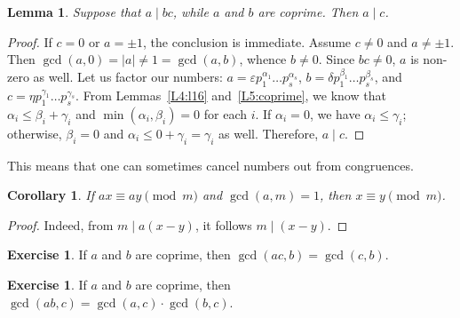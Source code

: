 \documentclass[12pt,notitlepage]{article}
\theoremstyle{plain}
\newtheorem{lemma}[thm]{Lemma}
\newtheorem{corr}[thm]{Corollary}
\theoremstyle{definition}
\newtheorem{exc}[thm]{Exercise}
\theoremstyle{plain}
\newcommand{\eps}{\varepsilon}
\newcommand{\1}{\mathbf{1}}
\newcommand{\0}{\mathbf{0}}
\newcommand{\dvd}{\mathop{\mid}}
\begin{document}

\begin{lemma}\label{L5:l2}
Suppose that $a \dvd b c$, while $a$ and $b$ are coprime. Then $a \dvd c$.
\end{lemma}
\begin{proof}
If $c = 0$ or $a =  \pm 1$, the conclusion is immediate. Assume $c \neq 0$ and $a \neq \pm 1$. Then $\gcd(a,0) = |a| \neq 1 = \gcd(a,b)$, whence $b \neq 0$. Since $bc \neq 0$, $a$ is non-zero as well. Let us factor our numbers: $a = \eps p^{\alpha_1}_1\ldots p^{\alpha_s}_s$, $b = \delta p^{\beta_1}_1\ldots p^{\beta_s}_s$, and $c = \eta p^{\gamma_1}_1\ldots p^{\gamma_s}_s$. From Lemmas~\ref{L4:l16} and~\ref{L5:coprime}, we know that $\alpha_i \leq \beta_i + \gamma_i$ and $\min(\alpha_i, \beta_i) = 0$ for each $i$. If $\alpha_i = 0$, we have $\alpha_i \leq \gamma_i$; otherwise, $\beta_i = 0$ and $\alpha_i \leq 0 + \gamma_i = \gamma_i$ as well. Therefore, $a \dvd c$.
\end{proof}
\noindent This means that one can sometimes cancel numbers out from congruences.
\begin{corr}\label{L5:c_cancel}
If $a x \equiv a y \pmod m$ and $\gcd(a, m) = 1$, then $x \equiv y \pmod m$.
\end{corr}
\begin{proof}
Indeed, from $m \dvd a(x - y)$,  it follows $m \dvd (x - y)$.
\end{proof}

\begin{exc}\label{L5:gcd_copirme1}
If $a$ and $b$ are coprime, then $\gcd(ac, b) = \gcd(c, b)$.
\end{exc}

\begin{exc}\label{L5:gcd_copirme2}
If $a$ and $b$ are coprime, then $\gcd(ab, c) = \gcd(a,c) \cdot \gcd(b,c)$.
\end{exc}
\end{document}
